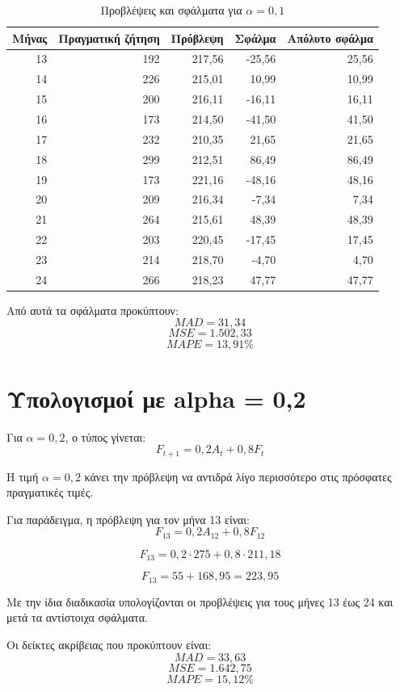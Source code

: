 \documentclass[12pt,a4paper]{article}
\begin{document}
\begin{table}[H]
\centering
\caption{Προβλέψεις και σφάλματα για \(\alpha=0{,}1\)}
\small
\begin{tabular}{rrrrr}
\toprule
\textbf{Μήνας} & \textbf{Πραγματική ζήτηση} & \textbf{Πρόβλεψη} & \textbf{Σφάλμα} & \textbf{Απόλυτο σφάλμα} \\
\midrule
13 & 192 & 217,56 & -25,56 & 25,56 \\
14 & 226 & 215,01 & 10,99 & 10,99 \\
15 & 200 & 216,11 & -16,11 & 16,11 \\
16 & 173 & 214,50 & -41,50 & 41,50 \\
17 & 232 & 210,35 & 21,65 & 21,65 \\
18 & 299 & 212,51 & 86,49 & 86,49 \\
19 & 173 & 221,16 & -48,16 & 48,16 \\
20 & 209 & 216,34 & -7,34 & 7,34 \\
21 & 264 & 215,61 & 48,39 & 48,39 \\
22 & 203 & 220,45 & -17,45 & 17,45 \\
23 & 214 & 218,70 & -4,70 & 4,70 \\
24 & 266 & 218,23 & 47,77 & 47,77 \\
\bottomrule
\end{tabular}
\end{table}

Από αυτά τα σφάλματα προκύπτουν:
\[
MAD=31{,}34
\]
\[
MSE=1.502{,}33
\]
\[
MAPE=13{,}91\%
\]

\section{Υπολογισμοί με alpha = 0,2}

Για \(\alpha=0{,}2\), ο τύπος γίνεται:
\[
F_{t+1}=0{,}2A_t+0{,}8F_t
\]

Η τιμή \(\alpha=0{,}2\) κάνει την πρόβλεψη να αντιδρά λίγο περισσότερο στις πρόσφατες πραγματικές τιμές.

Για παράδειγμα, η πρόβλεψη για τον μήνα 13 είναι:
\[
F_{13}=0{,}2A_{12}+0{,}8F_{12}
\]

\[
F_{13}=0{,}2\cdot275+0{,}8\cdot211{,}18
\]

\[
F_{13}=55+168{,}95=223{,}95
\]

Με την ίδια διαδικασία υπολογίζονται οι προβλέψεις για τους μήνες 13 έως 24 και μετά τα αντίστοιχα σφάλματα.

Οι δείκτες ακρίβειας που προκύπτουν είναι:
\[
MAD=33{,}63
\]
\[
MSE=1.642{,}75
\]
\[
MAPE=15{,}12\%
\]
\end{document}
